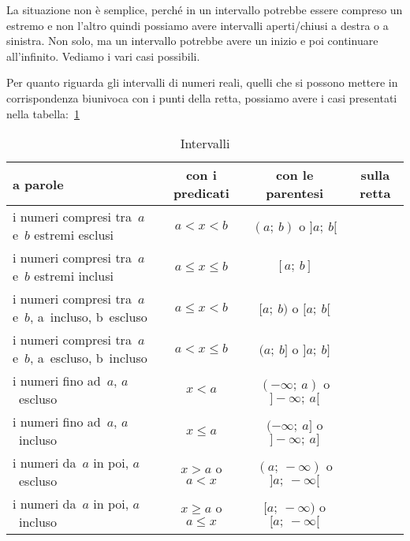 La situazione non è semplice, perché in un intervallo potrebbe essere compreso 
un estremo e non l'altro quindi possiamo avere intervalli aperti/chiusi
a destra o a sinistra. Non solo, ma un intervallo potrebbe avere un inizio
e poi continuare all'infinito. Vediamo i vari casi possibili.

Per quanto riguarda gli intervalli di numeri reali, quelli che si possono
mettere in corrispondenza biunivoca con i punti della retta, possiamo avere 
i casi presentati nella tabella:~\ref{tab:intervalli}

\begin{table}[h!]
\caption{Intervalli}
\center
\label{tab:intervalli}
 \begin{tabular}{p{4cm}|c|c|c}
  a parole   & con i predicati & con le parentesi & sulla retta \\
  \hline
  i numeri compresi tra~$a$ e~$b$ estremi esclusi & 
  $a < x < b$ & $(a;~b)$ o $]a;~b[$ & 
   \\
  \hline
  i numeri compresi tra~$a$ e~$b$ estremi inclusi & 
  $a \le x \le b$ & $[a;~b]$ & 
   \\
  \hline
  i numeri compresi tra~$a$ e~$b$, a~incluso, b~escluso & 
  $a \le x < b$ & $[a;~b)$ o $[a;~b[$ & 
   \\
  \hline
  i numeri compresi tra~$a$ e~$b$, a~escluso, b~incluso & 
  $a < x \le b$ & $(a;~b]$ o $]a;~b]$ & 
   \\
  \hline
  i numeri fino ad~$a$, $a$~escluso & 
  $x < a$ & $(-\infty;~a)$ o $]-\infty;~a[$ & 
   \\
  \hline
  i numeri fino ad~$a$, $a$~incluso & 
  $x \le a$ & $(-\infty;~a]$ o $]-\infty;~a]$ & 
   \\
  \hline
  i numeri da~$a$ in poi, $a$~escluso & 
  $x > a$ o $a < x$ & $(a;~-\infty)$ o $]a;~-\infty[$ & 
   \\
  \hline
  i numeri da~$a$ in poi, $a$~incluso & 
  $x \ge a$ o $a \le x$ & $[a;~-\infty)$ o $[a;~-\infty[$ & 
   
 \end{tabular}
\end{table}

